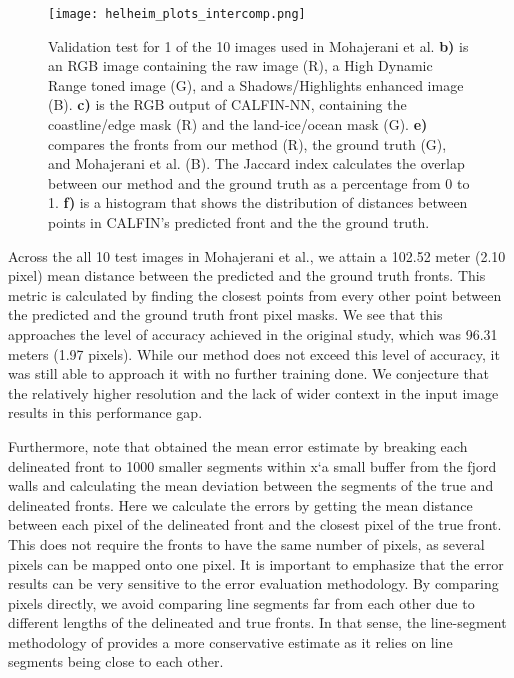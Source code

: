 \documentclass[tc, manuscript]{copernicus}
\begin{document}
\begin{figure}[t]
\texttt{[image: helheim\_plots\_intercomp.png]}
\caption{Validation test for 1 of the 10 images used in Mohajerani et al. \textbf{b)} is an RGB image containing the raw image (R), a High Dynamic Range toned image (G), and a Shadows/Highlights enhanced image (B). \textbf{c)} is the RGB output of CALFIN-NN, containing the coastline/edge mask (R) and the land-ice/ocean mask (G). \textbf{e)} compares the fronts from our method (R), the ground truth (G), and Mohajerani et al. (B). The Jaccard index calculates the overlap between our method and the ground truth as a percentage from 0 to 1. \textbf{f)} is a histogram that shows the distribution of distances between points in CALFIN's predicted front and the the ground truth.}
\centering
\end{figure}

Across the all 10 test images in Mohajerani et al., we attain a 102.52 meter (2.10 pixel) mean distance between the predicted and the ground truth fronts. This metric is calculated by finding the closest points from every other point between the predicted and the ground truth front pixel masks. We see that this approaches the level of accuracy achieved in the original study, which was 96.31 meters (1.97 pixels). While our method does not exceed this level of accuracy, it was still able to approach it with no further training done. We conjecture that the relatively higher resolution and the lack of wider context in the input image results in this performance gap.



Furthermore, note that \citep{mohajerani2019} obtained the mean error estimate by breaking each delineated front to 1000 smaller segments within x`a small buffer from the fjord walls and calculating the mean deviation between the segments of the true and delineated fronts. Here we calculate the errors by getting the mean distance between each pixel of the delineated front and the closest pixel of the true front. This does not require the fronts to have the same number of pixels, as several pixels can be mapped onto one pixel. It is important to emphasize that the error results can be very sensitive to the error evaluation methodology. By comparing pixels directly, we avoid comparing line segments far from each other due to different lengths of the delineated and true fronts. In that sense, the line-segment methodology of \citep{mohajerani2019} provides a more conservative estimate as it relies on line segments being close to each other.
\end{document}
